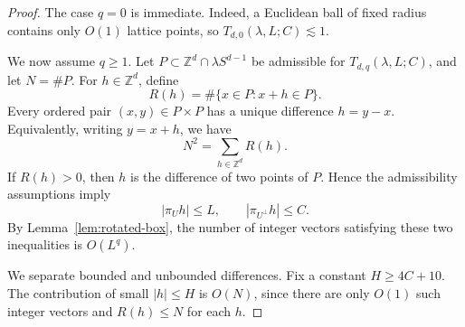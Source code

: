 \documentclass[11pt,reqno]{amsart}
\numberwithin{equation}{section}
\newcommand{\1}{\textbf{1}}
\newcommand{\ls}{\lesssim}
\newcommand{\Z}{\mathbb Z}
\begin{document}
	
	\begin{proof}
		The case $q=0$ is immediate. Indeed, a Euclidean ball of fixed radius contains only $O(1)$ lattice points,
		so $T_{d,0}(\lambda,L;C)\ls 1$.
		
		We now assume $q\ge1$.
		Let $P\subset \Z^d\cap\lambda S^{d-1}$ be admissible for
		$T_{d,q}(\lambda,L;C)$, and let $N=\#P$.  For $h\in\Z^d$, define
		\[
		R(h)=\#\{x\in P:x+h\in P\}.
		\]
		Every ordered pair $(x,y)\in P\times P$ has a unique difference
		$h=y-x$.  Equivalently, writing $y=x+h$, we have
		\[
		N^2=\sum_{h\in\Z^d}R(h).
		\]
		If $R(h)>0$, then $h$ is the difference of two points of $P$. Hence the
		admissibility assumptions imply
		\[
		|\pi_Uh|\le L,
		\qquad
		|\pi_{U^\perp}h|\le C.
		\]
		By Lemma~\ref{lem:rotated-box}, the number of integer vectors satisfying
		these two inequalities is $O(L^q)$.
		
		We separate bounded and unbounded differences.  Fix a constant
		$H\ge 4C+10$.  The contribution of small  $|h|\le H$ is
		$O(N)$, since there are only $O(1)$ such integer vectors and
		$R(h)\le N$ for each $h$.
		

\end{proof}
\end{document}

